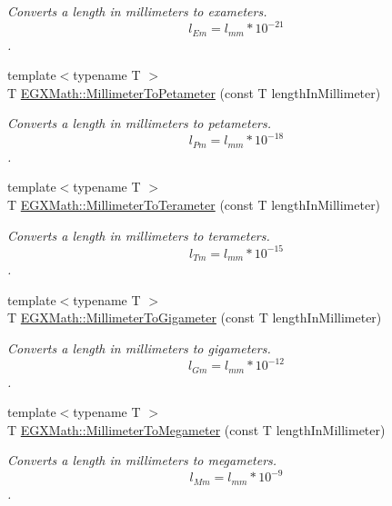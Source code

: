 \begin{DoxyCompactItemize}
\begin{DoxyCompactList}\small\item\em Converts a length in millimeters to exameters. \[ l_{Em}=l_{mm} * 10^{-21} \]. \end{DoxyCompactList}\item 
{\footnotesize template$<$typename T $>$ }\\T \mbox{\hyperlink{group___e_g_x_math-_conversions-_length_conversions-_millimeter-_s_i_ga02c5ee4941d1915c4d6d2b96788bb89f}{E\+G\+X\+Math\+::\+Millimeter\+To\+Petameter}} (const T length\+In\+Millimeter)
\begin{DoxyCompactList}\small\item\em Converts a length in millimeters to petameters. \[ l_{Pm}=l_{mm} * 10^{-18} \]. \end{DoxyCompactList}\item 
{\footnotesize template$<$typename T $>$ }\\T \mbox{\hyperlink{group___e_g_x_math-_conversions-_length_conversions-_millimeter-_s_i_ga0bd88917339b280d5df05adfddc6661a}{E\+G\+X\+Math\+::\+Millimeter\+To\+Terameter}} (const T length\+In\+Millimeter)
\begin{DoxyCompactList}\small\item\em Converts a length in millimeters to terameters. \[ l_{Tm}=l_{mm} * 10^{-15} \]. \end{DoxyCompactList}\item 
{\footnotesize template$<$typename T $>$ }\\T \mbox{\hyperlink{group___e_g_x_math-_conversions-_length_conversions-_millimeter-_s_i_gaeadd93f73f66f5b904919def3d44e858}{E\+G\+X\+Math\+::\+Millimeter\+To\+Gigameter}} (const T length\+In\+Millimeter)
\begin{DoxyCompactList}\small\item\em Converts a length in millimeters to gigameters. \[ l_{Gm}=l_{mm} * 10^{-12} \]. \end{DoxyCompactList}\item 
{\footnotesize template$<$typename T $>$ }\\T \mbox{\hyperlink{group___e_g_x_math-_conversions-_length_conversions-_millimeter-_s_i_ga2e4c24dcd2559aebefe78e13fbd0e394}{E\+G\+X\+Math\+::\+Millimeter\+To\+Megameter}} (const T length\+In\+Millimeter)
\begin{DoxyCompactList}\small\item\em Converts a length in millimeters to megameters. \[ l_{Mm}=l_{mm} * 10^{-9} \]. \end{DoxyCompactList}\item 

\end{DoxyCompactItemize}

